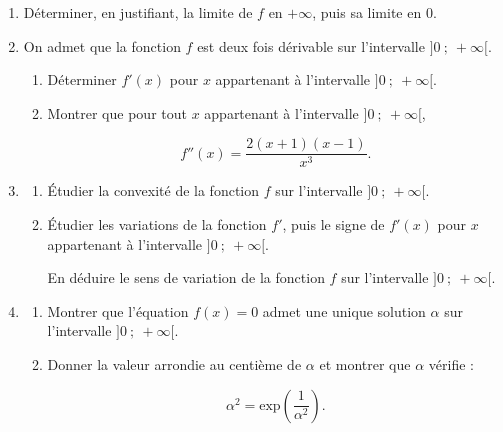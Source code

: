 \documentclass[10pt]{article}
\begin{document}
\begin{enumerate}
\item Déterminer, en justifiant, la limite de $f$ en $+\infty$, puis sa limite en $0$.
\item On admet que la fonction $f$ est deux fois dérivable sur l'intervalle $]0~;~+\infty[$.
	\begin{enumerate}
		\item Déterminer $f'(x)$ pour $x$ appartenant à l'intervalle $]0~;~+\infty[$.
		\item Montrer que pour tout $x$ appartenant à l'intervalle $]0~;~+\infty[$,

\[f''(x) = \dfrac{2(x + 1)(x - 1)}{x^3}.\]
	\end{enumerate}
\item 
	\begin{enumerate}
		\item Étudier la convexité de la fonction $f$ sur l'intervalle $]0~;~+\infty[$.
		\item Étudier les variations de la fonction $f'$, puis le signe de $f'(x)$ pour $x$ appartenant à l'intervalle $]0~;~+\infty[$.
		
En déduire le sens de variation de la fonction $f$ sur l'intervalle $]0~;~+\infty[$.
	\end{enumerate}
\item
	\begin{enumerate}
		\item Montrer que l'équation $f(x) = 0$ admet une unique solution $\alpha$ sur l'intervalle $]0~;~+\infty[$.
		\item Donner la valeur arrondie au centième de $\alpha$ et montrer que $\alpha$ vérifie :
		
\[\alpha^2 = \text{exp} \left(\dfrac{1}{\alpha^2}\right).\]
	\end{enumerate}
\end{enumerate}

\bigskip
\end{document}
